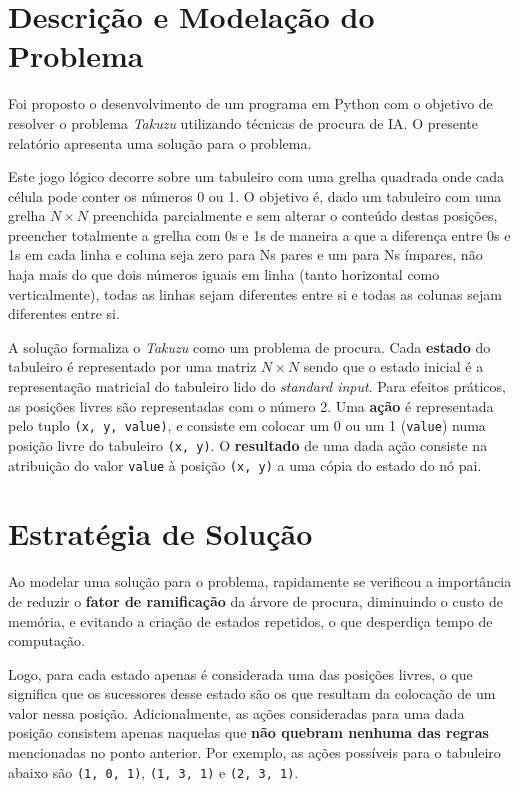 \documentclass[12pt,a4paper]{article}
\begin{document}
\section{Descrição e Modelação do Problema}

Foi proposto o desenvolvimento de um programa em Python com o objetivo de resolver o
problema \textit{Takuzu} utilizando técnicas de procura de IA.
O presente relatório apresenta uma solução para o problema.

Este jogo lógico decorre sobre um tabuleiro com uma grelha quadrada onde cada célula
pode conter os números 0 ou 1.
O objetivo é, dado um tabuleiro com uma grelha \(N \times N\) preenchida parcialmente e
sem alterar o conteúdo destas posições, preencher totalmente a grelha com 0s e 1s de maneira
a que a diferença entre 0s e 1s em cada linha e coluna seja zero para Ns pares e um para Ns ímpares,
não haja mais do que dois números iguais em linha (tanto horizontal como verticalmente),
todas as linhas sejam diferentes entre si e todas as colunas sejam diferentes entre si.

A solução formaliza o \textit{Takuzu} como um problema de procura.
Cada \textbf{estado} do tabuleiro é representado por uma matriz \(N \times N\) sendo que o estado inicial
é a representação matricial do tabuleiro lido do \textit{standard input}.
Para efeitos práticos, as posições livres são representadas com o número 2.
Uma \textbf{ação} é representada pelo tuplo \texttt{(x, y, value)}, e consiste em colocar um 0 ou um 1 (\texttt{value})
numa posição livre do tabuleiro \texttt{(x, y)}. O \textbf{resultado} de uma dada ação consiste na
atribuição do valor \texttt{value} à posição \texttt{(x, y)} a uma cópia do estado do nó pai.

\section{Estratégia de Solução}

Ao modelar uma solução para o problema, rapidamente se verificou a importância de reduzir
o \textbf{fator de ramificação} da árvore de procura, diminuindo o custo de memória,
e evitando a criação de estados repetidos, o que desperdiça tempo de computação.

Logo, para cada estado apenas é considerada uma das posições livres, o que significa
que os sucessores desse estado são os que resultam da colocação de um valor nessa posição.
Adicionalmente, as ações consideradas para uma dada posição consistem apenas naquelas que
\textbf{não quebram nenhuma das regras} mencionadas no ponto anterior.
Por exemplo, as ações possíveis para o tabuleiro abaixo são
\texttt{(1, 0, 1)}, \texttt{(1, 3, 1)} e \texttt{(2, 3, 1)}.
\end{document}
